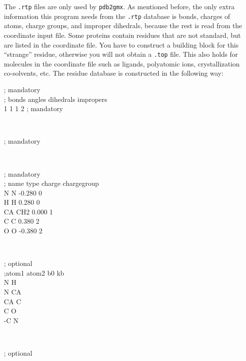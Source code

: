 The {\tt .rtp} files are only used by {\tt pdb2gmx}.
As mentioned before, the only extra information this
program needs from the {\tt .rtp} database is bonds, charges of atoms,
charge groups, and improper dihedrals, because the rest is read from
the coordinate input file.
Some proteins contain residues that are not standard, but are
listed in the coordinate file. You have to construct a building block
for this ``strange'' residue, otherwise you will not obtain a
{\tt *.top} file. This also holds for molecules in the
coordinate file such as ligands, polyatomic ions, crystallization co-solvents, etc.
The residue database is constructed in the following way:\\
\begin{small}
\begin{tt}
[ bondedtypes ]  ; mandatory\\
; bonds  angles  dihedrals  impropers\\
     1       1          1          2  ; mandatory\\
\end{tt}\\
\begin{tt}
[ GLY ]  ; mandatory\\
\end{tt}\\
\begin{tt}
 [ atoms ]  ; mandatory \\
; name  type  charge  chargegroup \\
     N     N  -0.280     0\\
     H     H   0.280     0\\
    CA   CH2   0.000     1\\
     C     C   0.380     2\\
     O     O  -0.380     2\\
\end{tt}\\
\begin{tt}
 [ bonds ]  ; optional\\
;atom1 atom2      b0      kb\\
     N     H\\
     N    CA\\
    CA     C\\
     C     O\\
    -C     N\\
\end{tt}\\
\begin{tt}
 [ exclusions ]  ; optional\\

\end{tt}
\end{small}
